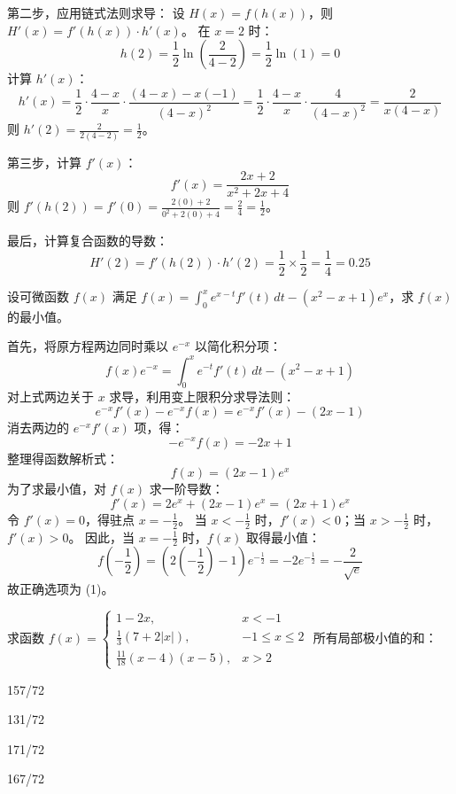 \begin{questions}
\begin{solution}
第二步，应用链式法则求导：
设 $H(x) = f(h(x))$，则 $H'(x) = f'(h(x)) \cdot h'(x)$。
在 $x=2$ 时：
\[
h(2) = \frac{1}{2}\ln\left(\frac{2}{4-2}\right) = \frac{1}{2}\ln(1) = 0
\]
计算 $h'(x)$：
\[
h'(x) = \frac{1}{2} \cdot \frac{4-x}{x} \cdot \frac{(4-x) - x(-1)}{(4-x)^2} = \frac{1}{2} \cdot \frac{4-x}{x} \cdot \frac{4}{(4-x)^2} = \frac{2}{x(4-x)}
\]
则 $h'(2) = \frac{2}{2(4-2)} = \frac{1}{2}$。

第三步，计算 $f'(x)$：
\[
f'(x) = \frac{2x + 2}{x^2 + 2x + 4}
\]
则 $f'(h(2)) = f'(0) = \frac{2(0) + 2}{0^2 + 2(0) + 4} = \frac{2}{4} = \frac{1}{2}$。

最后，计算复合函数的导数：
\[
H'(2) = f'(h(2)) \cdot h'(2) = \frac{1}{2} \times \frac{1}{2} = \frac{1}{4} = 0.25
\]
\end{solution}

\question
设可微函数 $f(x)$ 满足 $f(x) = \int_{0}^{x} e^{x-t} f'(t) \, dt - (x^2 - x + 1)e^x$，求 $f(x)$ 的最小值。

\begin{solution}
首先，将原方程两边同时乘以 $e^{-x}$ 以简化积分项：
\[
f(x)e^{-x} = \int_{0}^{x} e^{-t} f'(t) \, dt - (x^2 - x + 1)
\]
对上式两边关于 $x$ 求导，利用变上限积分求导法则：
\[
e^{-x}f'(x) - e^{-x}f(x) = e^{-x}f'(x) - (2x - 1)
\]
消去两边的 $e^{-x}f'(x)$ 项，得：
\[
-e^{-x}f(x) = -2x + 1
\]
整理得函数解析式：
\[
f(x) = (2x - 1)e^x
\]
为了求最小值，对 $f(x)$ 求一阶导数：
\[
f'(x) = 2e^x + (2x - 1)e^x = (2x + 1)e^x
\]
令 $f'(x) = 0$，得驻点 $x = -\frac{1}{2}$。
当 $x < -\frac{1}{2}$ 时，$f'(x) < 0$；当 $x > -\frac{1}{2}$ 时，$f'(x) > 0$。
因此，当 $x = -\frac{1}{2}$ 时，$f(x)$ 取得最小值：
\[
f\left( -\frac{1}{2} \right) = \left( 2\left( -\frac{1}{2} \right) - 1 \right) e^{-\frac{1}{2}} = -2e^{-\frac{1}{2}} = -\frac{2}{\sqrt{e}}
\]
故正确选项为 (1)。
\end{solution}

\question 
求函数 $f(x) = \begin{cases} 1 - 2x, & x < -1 \\ \frac{1}{3}(7 + 2|x|), & -1 \leq x \leq 2 \\ \frac{11}{18}(x - 4)(x - 5), & x > 2 \end{cases}$ 所有局部极小值的和：
\begin{choices}
    \item 157/72
    \item 131/72
    \item 171/72
    \item 167/72
\end{choices}


\end{questions}
